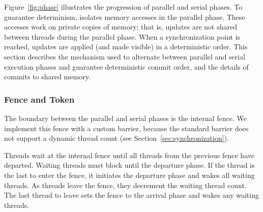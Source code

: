 Figure~\ref{fig:phase} illustrates the progression of parallel and serial phases. 
To guarantee determinism, \dthreads{} isolates memory accesses in the parallel phase. These accesses work on private copies of memory; that is, updates are not shared between threads during the parallel phase.
When a synchronization point is reached, updates are applied (and made visible) in a deterministic order.  
This section describes the mechanism used to alternate between parallel and serial execution phases 
and guarantee deterministic commit order, and the details of commits to shared memory.

\subsubsection{Fence and Token}
\label{sec:schedule}

The boundary between the parallel and serial phases is the internal
fence. We implement this fence with a custom barrier, because the
standard \pthreads{} barrier does not support a dynamic thread count
(see Section~\ref{sec:synchronization}).



Threads wait at the internal fence until all threads from the
previous fence have departed. Waiting threads must block until
the departure phase. If the thread is the last to enter the fence, it
initiates the departure phase and wakes all waiting threads.  As threads
leave the fence, they decrement the waiting thread count.  The last
thread to leave sets the fence to the arrival phase and wakes any
waiting threads.

